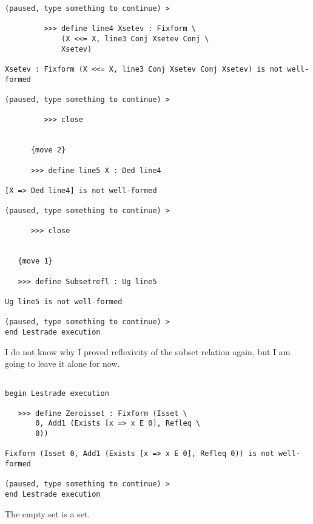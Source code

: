 \documentclass[12pt]{article}
\begin{document}
\begin{verbatim}
(paused, type something to continue) >

         >>> define line4 Xsetev : Fixform \
             (X <<= X, line3 Conj Xsetev Conj \
             Xsetev)

Xsetev : Fixform (X <<= X, line3 Conj Xsetev Conj Xsetev) is not well-formed

(paused, type something to continue) >

         >>> close


      {move 2}

      >>> define line5 X : Ded line4

[X => Ded line4] is not well-formed

(paused, type something to continue) >

      >>> close


   {move 1}

   >>> define Subsetrefl : Ug line5

Ug line5 is not well-formed

(paused, type something to continue) >
end Lestrade execution
\end{verbatim}

I do not know why I proved reflexivity of the subset relation again, but I am going to leave it alone for now.

\begin{verbatim}

begin Lestrade execution

   >>> define Zeroisset : Fixform (Isset \
       0, Add1 (Exists [x => x E 0], Refleq \
       0))

Fixform (Isset 0, Add1 (Exists [x => x E 0], Refleq 0)) is not well-formed

(paused, type something to continue) >
end Lestrade execution
\end{verbatim}

The empty set is a set.
\end{document}
